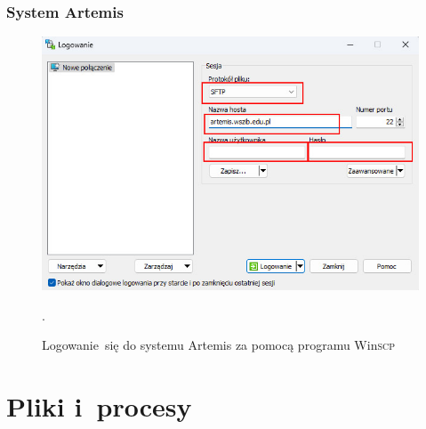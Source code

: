 \documentclass[10pt,t]{beamer}
\begin{document}
\begin{frame}
  \frametitle{System Artemis}

  \vspace{-0.5em}


  \begin{figure}

    \centering


    \includegraphics[scale=0.45]
    {./Presentations-pictures/Miscancellous-pictures/Artemis.jpg}


    \caption{Logowanie~się do systemu Artemis za pomocą programu
      Win\textsc{scp}}.


    \label{fig:Artemis-system}

  \end{figure}

\end{frame}










\section{Pliki i~procesy}
\end{document}
